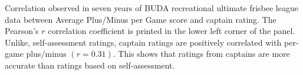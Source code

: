 Correlation observed in seven years of BUDA recreational ultimate frisbee league data between Average Plus/Minus per Game score and captain rating.  The Pearson's $r$ correlation coefficient is printed in the lower left corner of the panel. Unlike, self-assessment ratings, captain ratings are positively correlated with per-game plus/minus $(r = 0.31)$. This shows that ratings from captains are more accurate than ratings based on self-assessment. \label{fig:correlation_captain}